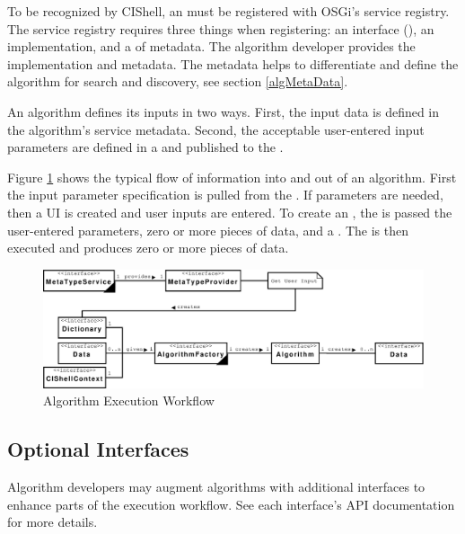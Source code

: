 To be recognized by CIShell, an  must be registered with
OSGi's service registry. The service registry requires three things when
registering: an interface (), an implementation, and a
 of metadata. The algorithm developer provides the
implementation and metadata. The metadata helps to differentiate and define the
algorithm for search and discovery, see section \ref{algMetaData}.

An algorithm defines its inputs in two ways. First, the input data is defined in
the algorithm's service metadata. Second, the acceptable user-entered
input parameters are defined in a  and published to the
.

Figure \ref{fig:algExecWorkflow} shows the typical flow of information into and
out of an algorithm. First the input parameter specification is pulled from the
. If parameters are needed, then a UI is created and
user inputs are entered. To create an , the
 is passed the user-entered parameters, zero or more
pieces of data, and a . The  is then
executed and produces zero or more pieces of data.

\begin{figure}[htb!]
\centering
\includegraphics[width=150mm]{../img/algExecWorkflow.pdf}
\caption{Algorithm Execution Workflow}
\label{fig:algExecWorkflow}
\end{figure}


\subsection{Optional Interfaces}

Algorithm developers may augment algorithms with additional interfaces to enhance
parts of the execution workflow. See each interface's API documentation for more
details.

